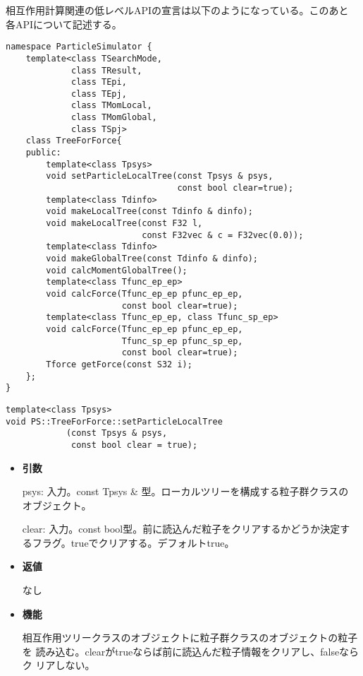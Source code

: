 相互作用計算関連の低レベルAPIの宣言は以下のようになっている。このあと
各APIについて記述する。
\begin{lstlisting}[caption=TreeForForce1]
namespace ParticleSimulator {
    template<class TSearchMode,
             class TResult,
             class TEpi,
             class TEpj,
             class TMomLocal,
             class TMomGlobal,
             class TSpj>
    class TreeForForce{
    public:
        template<class Tpsys>
        void setParticleLocalTree(const Tpsys & psys,
                                  const bool clear=true);
        template<class Tdinfo>
        void makeLocalTree(const Tdinfo & dinfo);
        void makeLocalTree(const F32 l,
                           const F32vec & c = F32vec(0.0));
        template<class Tdinfo>
        void makeGlobalTree(const Tdinfo & dinfo);        
        void calcMomentGlobalTree();
        template<class Tfunc_ep_ep>
        void calcForce(Tfunc_ep_ep pfunc_ep_ep,
                       const bool clear=true);  
        template<class Tfunc_ep_ep, class Tfunc_sp_ep>
        void calcForce(Tfunc_ep_ep pfunc_ep_ep,
                       Tfunc_sp_ep pfunc_sp_ep,
                       const bool clear=true);
        Tforce getForce(const S32 i);
    };
}
\end{lstlisting}


\begin{screen}
\begin{verbatim}
template<class Tpsys>
void PS::TreeForForce::setParticleLocalTree
            (const Tpsys & psys,
             const bool clear = true);
\end{verbatim}
\end{screen}

\begin{itemize}

\item {\bf 引数}

psys: 入力。const Tpsys \& 型。ローカルツリーを構成する粒子群クラスの
オブジェクト。

clear: 入力。const bool型。前に読込んだ粒子をクリアするかどうか決定す
るフラグ。trueでクリアする。デフォルトtrue。

\item {\bf 返値}

なし

\item {\bf 機能}

相互作用ツリークラスのオブジェクトに粒子群クラスのオブジェクトの粒子を
読み込む。clearがtrueならば前に読込んだ粒子情報をクリアし、falseならク
リアしない。

\end{itemize}

